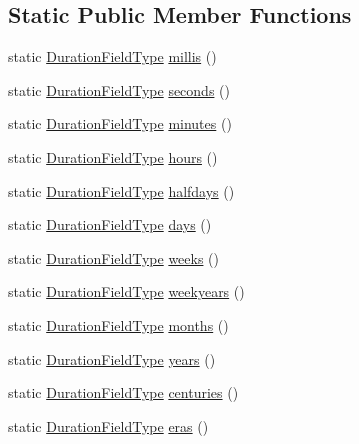 \subsection*{Static Public Member Functions}
\begin{DoxyCompactItemize}
\item 
static \hyperlink{classorg_1_1joda_1_1time_1_1_duration_field_type}{Duration\-Field\-Type} \hyperlink{classorg_1_1joda_1_1time_1_1_duration_field_type_aec24f1cce58bd7c4ca431035b3fcd72c}{millis} ()
\item 
static \hyperlink{classorg_1_1joda_1_1time_1_1_duration_field_type}{Duration\-Field\-Type} \hyperlink{classorg_1_1joda_1_1time_1_1_duration_field_type_af101eddfd23dd81d67a713325e09c3b9}{seconds} ()
\item 
static \hyperlink{classorg_1_1joda_1_1time_1_1_duration_field_type}{Duration\-Field\-Type} \hyperlink{classorg_1_1joda_1_1time_1_1_duration_field_type_a34880b6497c200bb98cfc5c832b13108}{minutes} ()
\item 
static \hyperlink{classorg_1_1joda_1_1time_1_1_duration_field_type}{Duration\-Field\-Type} \hyperlink{classorg_1_1joda_1_1time_1_1_duration_field_type_a7bc453bdc64d93609a56096f77a8dab6}{hours} ()
\item 
static \hyperlink{classorg_1_1joda_1_1time_1_1_duration_field_type}{Duration\-Field\-Type} \hyperlink{classorg_1_1joda_1_1time_1_1_duration_field_type_ac619900ea4f7b15a8c97a7d1be3fcbe0}{halfdays} ()
\item 
static \hyperlink{classorg_1_1joda_1_1time_1_1_duration_field_type}{Duration\-Field\-Type} \hyperlink{classorg_1_1joda_1_1time_1_1_duration_field_type_a44d96899b1472be32731d4bebb446b11}{days} ()
\item 
static \hyperlink{classorg_1_1joda_1_1time_1_1_duration_field_type}{Duration\-Field\-Type} \hyperlink{classorg_1_1joda_1_1time_1_1_duration_field_type_a40b22e2c1ac6ca73389251fc09de754c}{weeks} ()
\item 
static \hyperlink{classorg_1_1joda_1_1time_1_1_duration_field_type}{Duration\-Field\-Type} \hyperlink{classorg_1_1joda_1_1time_1_1_duration_field_type_a2a626b31903fe29ab4279249bd6ae669}{weekyears} ()
\item 
static \hyperlink{classorg_1_1joda_1_1time_1_1_duration_field_type}{Duration\-Field\-Type} \hyperlink{classorg_1_1joda_1_1time_1_1_duration_field_type_a1235aac3dbaf26aa21c7c230bccb2a70}{months} ()
\item 
static \hyperlink{classorg_1_1joda_1_1time_1_1_duration_field_type}{Duration\-Field\-Type} \hyperlink{classorg_1_1joda_1_1time_1_1_duration_field_type_a5f49a04237000b49ef08e7316845ea06}{years} ()
\item 
static \hyperlink{classorg_1_1joda_1_1time_1_1_duration_field_type}{Duration\-Field\-Type} \hyperlink{classorg_1_1joda_1_1time_1_1_duration_field_type_a631cc4b394d51adda73731a11acd28a0}{centuries} ()
\item 
static \hyperlink{classorg_1_1joda_1_1time_1_1_duration_field_type}{Duration\-Field\-Type} \hyperlink{classorg_1_1joda_1_1time_1_1_duration_field_type_a3974aa62fe8e8ac3f307aa6fa8afabd9}{eras} ()
\end{DoxyCompactItemize}
